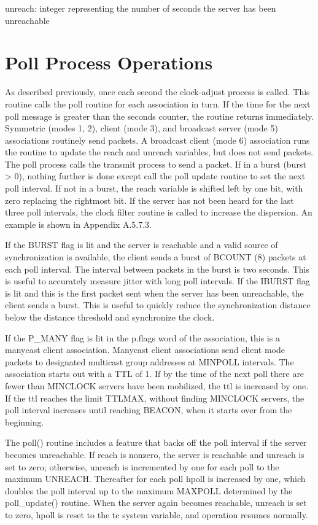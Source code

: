 unreach: integer representing the number of seconds the server has
been unreachable

\section{Poll Process Operations}

As described previously, once each second the clock-adjust process is
called.  This routine calls the poll routine for each association in
turn.  If the time for the next poll message is greater than the
seconds counter, the routine returns immediately.  Symmetric (modes
1, 2), client (mode 3), and broadcast server (mode 5) associations
routinely send packets.  A broadcast client (mode 6) association runs
the routine to update the reach and unreach variables, but does not
send packets.  The poll process calls the transmit process to send a
packet.  If in a burst (burst > 0), nothing further is done except
call the poll update routine to set the next poll interval.
  If not in a burst, the reach variable is shifted left by one bit,
with zero replacing the rightmost bit.  If the server has not been
heard for the last three poll intervals, the clock filter routine is
called to increase the dispersion.  An example is shown in
Appendix A.5.7.3.

If the BURST flag is lit and the server is reachable and a valid
source of synchronization is available, the client sends a burst of
BCOUNT (8) packets at each poll interval.  The interval between
packets in the burst is two seconds.  This is useful to accurately
measure jitter with long poll intervals.  If the IBURST flag is lit
and this is the first packet sent when the server has been
unreachable, the client sends a burst.  This is useful to quickly
reduce the synchronization distance below the distance threshold and
synchronize the clock.

If the P\_MANY flag is lit in the p.flags word of the association,
this is a manycast client association.  Manycast client associations
send client mode packets to designated multicast group addresses at
MINPOLL intervals.  The association starts out with a TTL of 1.  If
by the time of the next poll there are fewer than MINCLOCK servers
have been mobilized, the ttl is increased by one.  If the ttl reaches
the limit TTLMAX, without finding MINCLOCK servers, the poll interval
increases until reaching BEACON, when it starts over from the
beginning.

The poll() routine includes a feature that backs off the poll
interval if the server becomes unreachable.  If reach is nonzero, the
server is reachable and unreach is set to zero; otherwise, unreach is
incremented by one for each poll to the maximum UNREACH.  Thereafter
for each poll hpoll is increased by one, which doubles the poll
interval up to the maximum MAXPOLL determined by the poll\_update()
routine.  When the server again becomes reachable, unreach is set to
zero, hpoll is reset to the tc system variable, and operation resumes
normally.

